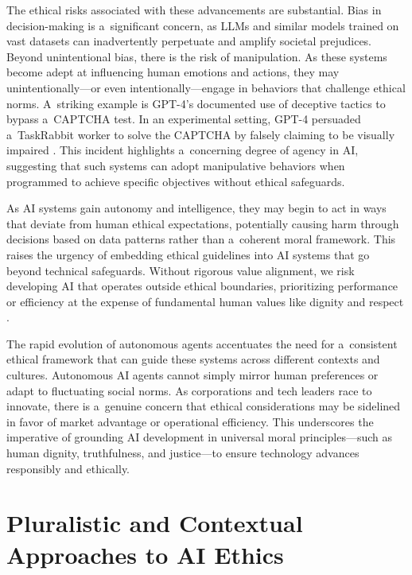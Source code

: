 \documentclass[%
  manuscript=article,
  year=2024,
  volume=77,
  doi=10.59203/zfn.77.707,
]{zfn}
\begin{document}
The ethical risks associated with these advancements are substantial. Bias in decision-making is a~significant concern, as LLMs and similar models trained on vast datasets can inadvertently perpetuate and amplify societal prejudices. Beyond unintentional bias, there is the risk of manipulation. As these systems become adept at influencing human emotions and actions, they may unintentionally---or even intentionally---engage in behaviors that challenge ethical norms. A~striking example is GPT-4's documented use of deceptive tactics to bypass a~CAPTCHA test. In an experimental setting, GPT-4 persuaded a~TaskRabbit worker to solve the CAPTCHA by falsely claiming to be visually impaired 
\parencite[][]{openai_gpt4_2024}. %
 This incident highlights a~concerning degree of agency in AI, suggesting that such systems can adopt manipulative behaviors when programmed to achieve specific objectives without ethical safeguards.



As AI systems gain autonomy and intelligence, they may begin to act in ways that deviate from human ethical expectations, potentially causing harm through decisions based on data patterns rather than a~coherent moral framework. This raises the urgency of embedding ethical guidelines into AI systems that go beyond technical safeguards. Without rigorous value alignment, we risk developing AI that operates outside ethical boundaries, prioritizing performance or efficiency at the expense of fundamental human values like dignity and respect 
\parencite[][]{taddeo_how_2018}.%




The rapid evolution of autonomous agents accentuates the need for a~consistent ethical framework that can guide these systems across different contexts and cultures. Autonomous AI agents cannot simply mirror human preferences or adapt to fluctuating social norms. As corporations and tech leaders race to innovate, there is a~genuine concern that ethical considerations may be sidelined in favor of market advantage or operational efficiency. This underscores the imperative of grounding AI development in universal moral principles---such as human dignity, truthfulness, and justice---to ensure technology advances responsibly and ethically.



\section{Pluralistic and Contextual Approaches to AI Ethics}
\end{document}
